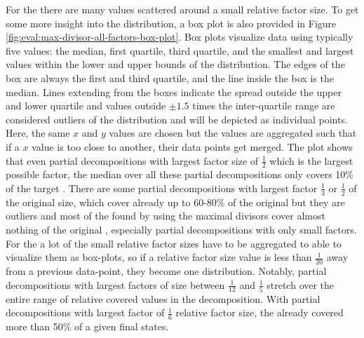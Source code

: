For the \andDecomp there are many values scattered around a small relative factor size.
To get some more insight into the distribution, a box plot is also provided in Figure \ref{fig:eval:max-divisor-all-factors-box-plot}.
Box plots visualize data using typically five values: the median, first quartile, third quartile, and the smallest and largest values within the lower and upper bounds of the distribution.
The edges of the box are always the first and third quartile, and the line inside the box is the median.
Lines extending from the boxes indicate the spread outside the upper and lower quartile and values outside $\pm 1.5$ times the inter-quartile range are considered outliers of the distribution and will be depicted as individual points.
Here, the same $x$ and $y$ values are chosen but the values are aggregated such that if a $x$ value is too close to another, their data points get merged.
The \orDecomp plot shows that even partial decompositions with largest factor size of $\frac{1}{2}$ which is the largest possible factor, the median over all these partial decompositions only covers 10\% of the target \DFA.
There are some partial decompositions with largest factor $\frac{1}{3}$ or $\frac{1}{2}$ of the original size, which cover already up to 60-80\% of the original \DFA but they are outliers and most of the \orDecomp found by using the maximal divisors cover almost nothing of the original \DFA, especially partial decompositions with only small factors.
For the \andDecomp a lot of the small relative factor sizes have to be aggregated to able to visualize them as box-plots, so if a relative factor size value is less than $\frac{1}{20}$ away from a previous data-point, they become one distribution.
Notably, partial decompositions with largest factors of size between $\frac{1}{12}$ and $\frac{1}{5}$ stretch over the entire range of relative covered values in the decomposition. With partial decompositions with largest factor of $\frac{1}{6}$ relative factor size, the \andDecomp already covered more than 50\% of a given \DFAs final states.


